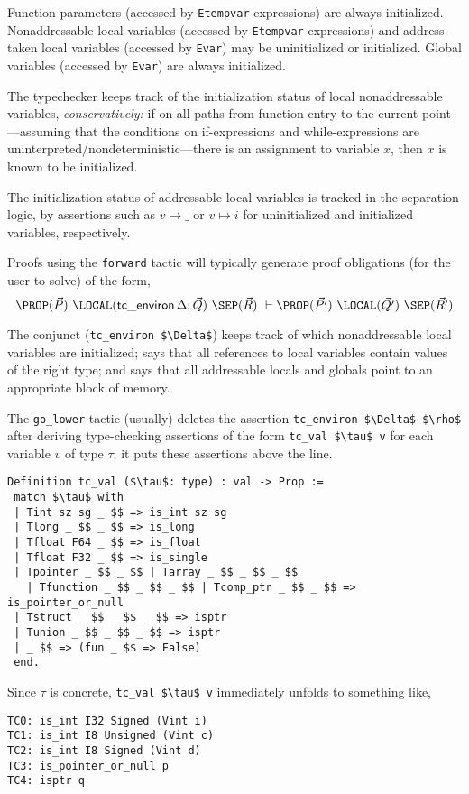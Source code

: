 \documentclass[12pt,fleqn,openany,oneside,showtrims]{memoir}
\begin{document}
Function parameters (accessed by
\lstinline{Etempvar} expressions)
are always initialized.
Nonaddressable local variables (accessed by
\lstinline{Etempvar} expressions) and address-taken local variables
(accessed by \lstinline{Evar})
may be uninitialized or initialized. 
Global variables (accessed by \lstinline{Evar}) are always
initialized.

The typechecker keeps track of the
initialization status of local nonaddressable 
variables, \emph{conservatively:}
if on all paths from function entry to the current
point---assuming that the conditions on if-expressions
and while-expressions are uninterpreted/nondeterministic---there
is an assignment to variable $x$, then $x$ is known to
be initialized.

The initialization status of addressable local variables
is tracked in the separation logic,
by assertions such as $v \mapsto \_$
or $v \mapsto i$ for uninitialized and initialized variables,
respectively.

Proofs using the \lstinline{forward} tactic will typically
generate proof obligations (for the user to solve)
of the form,
\[
\PROP(\vec{P})~
\LOCAL(\mathsf{tc\_environ}\,\Delta; \vec{Q})~
\SEP(\vec{R})
~\vdash
\PROP(\vec{P'})~
\LOCAL(\vec{Q'})~
\SEP(\vec{R'})
\]

The conjunct (\lstinline{tc_environ $\Delta$})
keeps track of which nonaddressable local variables are initialized;
says that all references to local variables
contain values of the right type;
and says that all addressable locals and globals point
to an appropriate block of memory.

The \lstinline{go_lower} tactic
(usually) deletes the assertion 
\lstinline{tc_environ $\Delta$ $\rho$}
after deriving type-checking assertions of the form
\lstinline{tc_val $\tau$ v}
for each variable $v$ of type $\tau$;
it puts these assertions above the line.
\pagebreak
\begin{lstlisting}
Definition tc_val ($\tau$: type) : val -> Prop :=
 match $\tau$ with 
 | Tint sz sg _ $$ => is_int sz sg
 | Tlong _ $$ _ $$ => is_long 
 | Tfloat F64 _ $$ => is_float
 | Tfloat F32 _ $$ => is_single
 | Tpointer _ $$ _ $$ | Tarray _ $$ _ $$ _ $$ 
   | Tfunction _ $$ _ $$ _ $$ | Tcomp_ptr _ $$ _ $$ => is_pointer_or_null
 | Tstruct _ $$ _ $$ _ $$ => isptr
 | Tunion _ $$ _ $$ _ $$ => isptr
 | _ $$ => (fun _ $$ => False)
 end.
\end{lstlisting}
Since $\tau$ is concrete, \lstinline{tc_val $\tau$ v}
immediately unfolds
to something like,
\begin{lstlisting}
TC0: is_int I32 Signed (Vint i)
TC1: is_int I8 Unsigned (Vint c)
TC2: is_int I8 Signed (Vint d)
TC3: is_pointer_or_null p
TC4: isptr q
\end{lstlisting}
\end{document}
